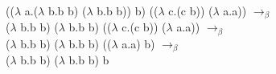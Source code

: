 \documentclass{article}
\begin{document}
\begin{flushleft}

(($\lambda$ a.($\lambda$ b.b b) ($\lambda$ b.b b)) b) (($\lambda$ c.(c b)) ($\lambda$ a.a)) $\rightarrow_\beta$ \\ 
($\lambda$ b.b b) ($\lambda$ b.b b) (($\lambda$ c.(c b)) ($\lambda$ a.a)) $\rightarrow_\beta$ \\ 
($\lambda$ b.b b) ($\lambda$ b.b b) (($\lambda$ a.a) b) $\rightarrow_\beta$ \\ 
($\lambda$ b.b b) ($\lambda$ b.b b) b 

\end{flushleft}
\end{document}
